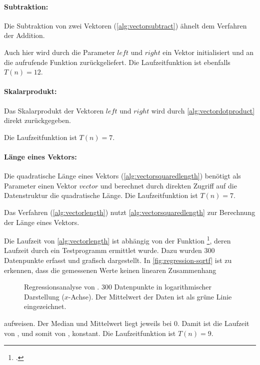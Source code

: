 \paragraph{Subtraktion:} %
\label{par:subtraktion}

Die Subtraktion von zwei Vektoren (\autoref{alg:vectorsubtract}) ähnelt dem Verfahren der Addition.

Auch hier wird durch die Parameter $\mathit{left}$ und $\mathit{right}$ ein Vektor initialisiert und an die
 aufrufende Funktion zurückgeliefert. Die Laufzeitfunktion ist ebenfalls $T(n) = 12$.


\paragraph{Skalarprodukt:} %
\label{par:skalarprodukt}

Das Skalarprodukt der Vektoren $\mathit{left}$ und $\mathit{right}$ wird durch \autoref{alg:vectordotproduct} direkt
 zurückgegeben.

Die Laufzeitfunktion ist $T(n) = 7$.


\paragraph{Länge eines Vektors:} %
\label{par:länge_eines_vektors}

Die quadratische Länge eines Vektors (\autoref{alg:vectorsquaredlength}) benötigt als Parameter einen Vektor
 $\mathit{vector}$ und berechnet durch direkten Zugriff auf die Datenstruktur die quadratische Länge. Die
 Laufzeitfunktion ist $T(n) = 7$.

Das Verfahren  (\autoref{alg:vectorlength}) nutzt \autoref{alg:vectorsquaredlength} zur Berechnung der
 Länge eines Vektors.

Die Laufzeit von \autoref{alg:vectorlength} ist abhängig von der Funktion \footcite[Vgl.][]{sqrtf},
 deren Laufzeit durch ein Testprogramm ermittlet wurde. Dazu wurden $300$ Datenpunkte erfasst und grafisch dargestellt.
 In \autoref{fig:regression-sqrtf} ist zu erkennen, dass die gemessenen Werte keinen linearen Zusammenhang
\begin{figure}[!ht]
	\centering
	
	\caption{Regressionsanalyse von . $300$ Datenpunkte in logarithmischer Darstellung ($x$-Achse). Der
	 Mittelwert der Daten ist als grüne Linie eingezeichnet.}
	\label{fig:regression-sqrtf}
\end{figure}
 aufweisen. Der Median und Mittelwert liegt jeweils bei $0$. Damit ist die Laufzeit von , und somit von
 , konstant. Die Laufzeitfunktion ist $T(n) = 9$.

